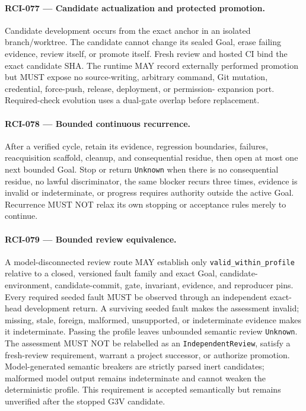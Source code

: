 \documentclass[11pt]{article}
\begin{document}
\paragraph{RCI-077 --- Candidate actualization and protected promotion.}
Candidate development occurs from the exact anchor in an isolated branch/worktree.
The candidate cannot change its sealed Goal, erase failing evidence, review itself,
or promote itself. Fresh review and hosted CI bind the exact candidate SHA. The runtime
MAY record externally performed promotion but MUST expose no source-writing, arbitrary
command, Git mutation, credential, force-push, release, deployment, or permission-
expansion port. Required-check evolution uses a dual-gate overlap before replacement.

\paragraph{RCI-078 --- Bounded continuous recurrence.}
After a verified cycle, retain its evidence, regression boundaries, failures,
reacquisition scaffold, cleanup, and consequential residue, then open at most one next
bounded Goal. Stop or return \texttt{Unknown} when there is no consequential residue,
no lawful discriminator, the same blocker recurs three times, evidence is invalid or
indeterminate, or progress requires authority outside the active Goal. Recurrence MUST
NOT relax its own stopping or acceptance rules merely to continue.

\paragraph{RCI-079 --- Bounded review equivalence.}
A model-disconnected review route MAY establish only
\texttt{valid\_within\_profile} relative to a closed, versioned fault family and exact
Goal, candidate-environment, candidate-commit, gate, invariant, evidence, and reproducer
pins. Every required seeded fault MUST be observed through an independent exact-head
development return. A surviving seeded fault makes the assessment invalid; missing,
stale, foreign, malformed, unsupported, or indeterminate evidence makes it
indeterminate. Passing the profile leaves unbounded semantic review \texttt{Unknown}.
The assessment MUST NOT be relabelled as an \texttt{IndependentReview}, satisfy a
fresh-review requirement, warrant a project successor, or authorize promotion.
Model-generated semantic breakers are strictly parsed inert candidates; malformed model
output remains indeterminate and cannot weaken the deterministic profile. This
requirement is accepted semantically but remains unverified after the stopped G3V
candidate.
\end{document}
